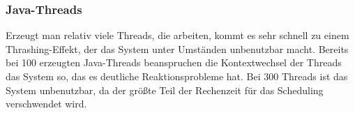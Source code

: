 \documentclass[a4paper,
12pt,
BCOR12mm,
]{scrartcl}
\begin{document}
\subsubsection{Java-Threads}
Erzeugt man relativ viele Threads, die arbeiten, kommt es sehr schnell zu einem Thrashing-Effekt, der das System
unter Umständen unbenutzbar macht. Bereits bei 100 erzeugten Java-Threads beanspruchen die Kontextwechsel der Threads
das System so, das es deutliche Reaktionsprobleme hat. Bei 300 Threads ist das System unbenutzbar, da der größte Teil
der Rechenzeit für das Scheduling verschwendet wird.
\end{document}

